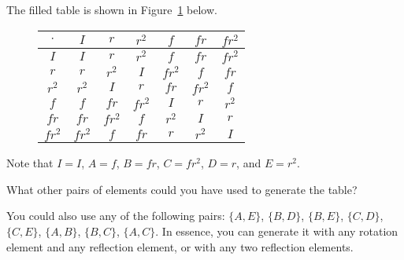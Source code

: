 \documentclass[../key.tex]{subfiles}
\begin{document}
\noindent The filled table is shown in Figure~\ref{fig:filled_alttable} below.

\begin{figure}[h]
	\begin{center}
		\begin{minipage}[b]{\textwidth}
			\centering
			\begin{tabular}{c|cccccc}
				\hline
				$\cdot$ & $I$ & $r$ & $r^2$ & $f$ & $fr$ & $fr^2$ \\ \hline 
				\rowcolor{light-gray}
				$I$ & $I$ & $r$ & $r^2$ & $f$ & $fr$ & $fr^2$ \\
				$r$ & $r$ & $r^2$ & $I$ & $fr^2$ & $f$ & $fr$ \\ 
				\rowcolor{light-gray}
				$r^2$ & $r^2$ & $I$ & $r$ & $fr$ & $fr^2$ & $f$ \\
				$f$ & $f$ & $fr$ & $fr^2$ & $I$ & $r$ & $r^2$ \\ 
				\rowcolor{light-gray}
				$fr$ & $fr$ & $fr^2$ & $f$ & $r^2$ & $I$ & $r$ \\
				$fr^2$ & $fr^2$ & $f$ & $fr$ & $r$ & $r^2$ & $I$ \\ \hline
			\end{tabular}
			\vspace*{0.5\baselineskip}
		\end{minipage}
	\end{center}
	\vspace*{-2\baselineskip}
	\begin{center}
		\begin{minipage}[t]{\textwidth}
			\label{fig:filled_alttable}
		\end{minipage}
	\end{center}
	\vspace*{-2\baselineskip}
\end{figure}

\noindent Note that $I=I$, $A=f$, $B=fr$, $C=fr^2$, $D=r$, and $E=r^2$.

\begin{outer_problem}
\item What other pairs of elements could you have used to generate the table?
\end{outer_problem}

\noindent You could also use any of the following pairs: $\{A,E\}$, $\{B,D\}$, $\{B,E\}$, $\{C,D\}$, $\{C,E\}$, $\{A,B\}$, $\{B,C\}$, $\{A,C\}$. In essence, you can generate it with any rotation element and any reflection element, or with any two reflection elements.
\end{document}
